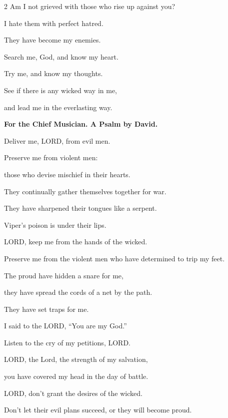\begin{multicols}{2}
	Am I not grieved with those who rise up against you?
	
	
	\myverse{}I hate them with perfect hatred.
	
	They have become my enemies.
	
	
	\myverse{}Search me, God, and know my heart.
	
	Try me, and know my thoughts.
	
	
	\myverse{}See if there is any wicked way in me,
	
	and lead me in the everlasting way.
	
	
	\mychapter{}\textbf{For the Chief Musician. A Psalm by David.}
	
   \myverse*{}Deliver me, LORD, from evil men.
	
	Preserve me from violent men:
	
	
	\myverse{}those who devise mischief in their hearts.
	
	They continually gather themselves together for war.
	
	
	\myverse{}They have sharpened their tongues like a serpent.
	
	Viper’s poison is under their lips.
	
	
	\vspace{\baselineskip}
	
	\myverse{}LORD, keep me from the hands of the wicked.
	
	Preserve me from the violent men who have determined to trip my feet.
	
	
	\myverse{}The proud have hidden a snare for me,
	
	they have spread the cords of a net by the path.
	
	They have set traps for me.
	
	
	\vspace{\baselineskip}
	
	
	
	\myverse{}I said to the LORD, “You are my God.”
	
	Listen to the cry of my petitions, LORD.
	
	
	\myverse{}LORD, the Lord, the strength of my salvation,
	
	you have covered my head in the day of battle.
	
	
	\myverse{}LORD, don’t grant the desires of the wicked.
	
	Don’t let their evil plans succeed, or they will become proud.
	

\end{multicols}
